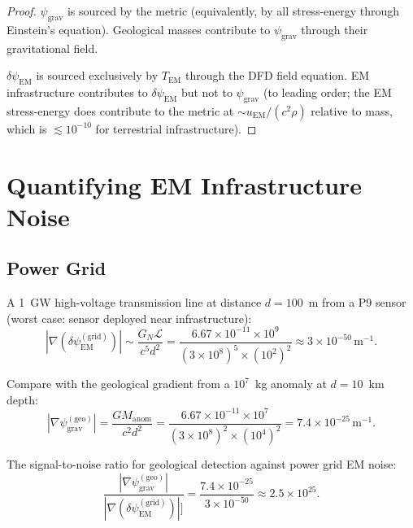 \documentclass[11pt]{article}
\theoremstyle{definition}
\theoremstyle{remark}
\newcommand{\ee}[1]{\times10^{#1}}
\newcommand{\psigrav}{\psi_{\mathrm{grav}}}
\newcommand{\dpsiem}{\delta\psi_{\mathrm{EM}}}
\newcommand{\GN}{G_N}
\begin{document}
\begin{proof}
$\psigrav$ is sourced by the metric (equivalently, by all stress-energy
through Einstein's equation). Geological masses contribute to $\psigrav$
through their gravitational field.

$\dpsiem$ is sourced exclusively by $T_{\mathrm{EM}}$ through the DFD
field equation. EM infrastructure contributes to $\dpsiem$ but not to
$\psigrav$ (to leading order; the EM stress-energy does contribute to
the metric at $\sim u_{\mathrm{EM}}/(c^2 \rho)$ relative to mass, which
is $\lesssim 10^{-10}$ for terrestrial infrastructure).
\end{proof}

\section{Quantifying EM Infrastructure Noise}
\label{sec:P9-EM-noise}

\subsection{Power Grid}

A 1~GW high-voltage transmission line at distance $d = 100$~m from a P9
sensor (worst case: sensor deployed near infrastructure):
\begin{equation}
|\nabla(\dpsiem^{(\mathrm{grid})})| \sim
\frac{\GN \mathcal{L}}{c^5 d^2}
= \frac{6.67\ee{-11} \times 10^9}{(3\ee{8})^5 \times (10^2)^2}
\approx 3\ee{-50}\,\mathrm{m}^{-1}.
\end{equation}

Compare with the geological gradient from a $10^7$~kg anomaly at
$d = 10$~km depth:
\begin{equation}
|\nabla\psigrav^{(\mathrm{geo})}| = \frac{G M_{\mathrm{anom}}}{c^2 d^2}
= \frac{6.67\ee{-11} \times 10^7}{(3\ee{8})^2 \times (10^4)^2}
= 7.4\ee{-25}\,\mathrm{m}^{-1}.
\end{equation}

The signal-to-noise ratio for geological detection against power grid
EM noise:
\begin{equation}
\frac{|\nabla\psigrav^{(\mathrm{geo})}|}{|\nabla(\dpsiem^{(\mathrm{grid})})|]}
= \frac{7.4\ee{-25}}{3\ee{-50}} \approx 2.5\ee{25}.
\label{eq:SNR-geo-grid}
\end{equation}
\end{document}
